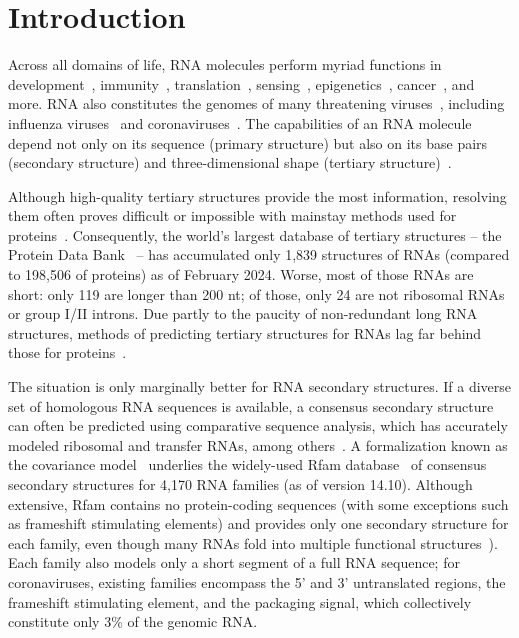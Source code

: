 \documentclass[main.tex]{subfiles}
\begin{document}
\section{Introduction}

Across all domains of life, RNA molecules perform myriad functions in development~\cite{Klattenhoff2013}, immunity~\cite{Wiedenheft2012}, translation~\cite{Noller2012}, sensing~\cite{Kortmann2012,Serganov2013}, epigenetics~\cite{Bhan2015}, cancer~\cite{Hajjari2015}, and more.
RNA also constitutes the genomes of many threatening viruses~\cite{Woolhouse2018}, including influenza viruses~\cite{Bouvier2008} and coronaviruses~\cite{Yang2015a}.
The capabilities of an RNA molecule depend not only on its sequence (primary structure) but also on its base pairs (secondary structure) and three-dimensional shape (tertiary structure)~\cite{Mortimer2014}.

Although high-quality tertiary structures provide the most information, resolving them often proves difficult or impossible with mainstay methods used for proteins~\cite{Kappel2020}.
Consequently, the world's largest database of tertiary structures -- the Protein Data Bank~\cite{Berman2000} -- has accumulated only 1,839 structures of RNAs (compared to 198,506 of proteins) as of February 2024.
Worse, most of those RNAs are short: only 119 are longer than 200 nt; of those, only 24 are not ribosomal RNAs or group I/II introns.
Due partly to the paucity of non-redundant long RNA structures, methods of predicting tertiary structures for RNAs lag far behind those for proteins~\cite{Schneider2023}.

The situation is only marginally better for RNA secondary structures.
If a diverse set of homologous RNA sequences is available, a consensus secondary structure can often be predicted using comparative sequence analysis, which has accurately modeled ribosomal and transfer RNAs, among others~\cite{Cannone2002}.
A formalization known as the covariance model~\cite{Eddy1994} underlies the widely-used Rfam database~\cite{Kalvari2020} of consensus secondary structures for 4,170 RNA families (as of version 14.10).
Although extensive, Rfam contains no protein-coding sequences (with some exceptions such as frameshift stimulating elements) and provides only one secondary structure for each family, even though many RNAs fold into multiple functional structures~\cite{Mustoe2014,Spitale2023}).
Each family also models only a short segment of a full RNA sequence; for coronaviruses, existing families encompass the 5' and 3' untranslated regions, the frameshift stimulating element, and the packaging signal, which collectively constitute only 3\% of the genomic RNA.
\end{document}
